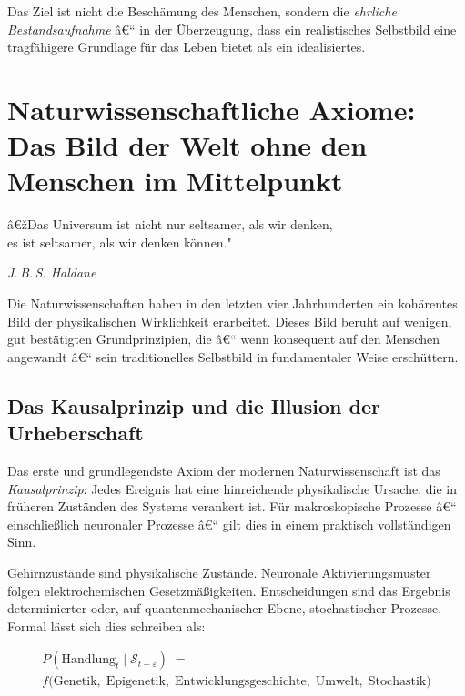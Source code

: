 ﻿\documentclass[12pt, a4paper]{article}
\begin{document}
Das Ziel ist nicht die Beschämung des Menschen, sondern die \emph{ehrliche
Bestandsaufnahme} â€“ in der Überzeugung, dass ein realistisches Selbstbild eine
tragfähigere Grundlage für das Leben bietet als ein idealisiertes.

\section{Naturwissenschaftliche Axiome: Das Bild der Welt ohne den Menschen im Mittelpunkt}

\epigraph{â€žDas Universum ist nicht nur seltsamer, als wir denken,\\
es ist seltsamer, als wir denken können."}{\textit{J.\,B.\,S. Haldane}}

Die Naturwissenschaften haben in den letzten vier Jahrhunderten ein kohärentes
Bild der physikalischen Wirklichkeit erarbeitet. Dieses Bild beruht auf wenigen,
gut bestätigten Grundprinzipien, die â€“ wenn konsequent auf den Menschen angewandt â€“
sein traditionelles Selbstbild in fundamentaler Weise erschüttern.

\subsection{Das Kausalprinzip und die Illusion der Urheberschaft}

Das erste und grundlegendste Axiom der modernen Naturwissenschaft ist das
\emph{Kausalprinzip}: Jedes Ereignis hat eine hinreichende physikalische Ursache,
die in früheren Zuständen des Systems verankert ist. Für makroskopische Prozesse â€“
einschließlich neuronaler Prozesse â€“ gilt dies in einem praktisch vollständigen Sinn.

Gehirnzustände sind physikalische Zustände. Neuronale Aktivierungsmuster folgen
elektrochemischen Gesetzmäßigkeiten. Entscheidungen sind das Ergebnis determinierter
oder, auf quantenmechanischer Ebene, stochastischer Prozesse. Formal lässt sich dies
schreiben als:

\begin{multline}
  P(\text{Handlung}_t \mid \mathcal{S}_{t-\varepsilon}) \;=\\
  f\!\bigl(\text{Genetik},\;\text{Epigenetik},\;\text{Entwicklungsgeschichte},\;
  \text{Umwelt},\;\text{Stochastik}\bigr)
\end{multline}
\end{document}
